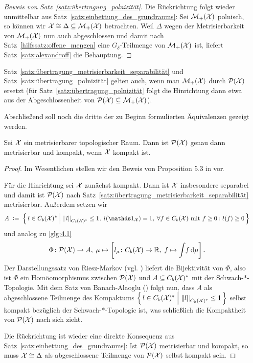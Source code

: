\documentclass[../main/main.tex]{subfiles}
\begin{document}
\begin{proof}[Beweis von Satz~\ref{satz:übertragung_polnizität}]
		Die Rückrichtung folgt wieder unmittelbar aus Satz~\ref{satz:einbettung_des_grundraums}: Sei $\mathcal{M}_{+}(\mathcal{X})$ polnisch, 
		so können wir $\mathcal{X} \cong \Delta \subseteq \mathcal{M}_{+}(\mathcal{X})$ betrachten. Weil $\Delta$ wegen der Metrisierbarkeit von $\mathcal{M}_{+}(\mathcal{X})$ nun auch abgeschlossen und damit nach 
		Satz~\ref{hilfssatz:offene_mengen} eine $G_\delta$-Teilmenge von $\mathcal{M}_{+}(\mathcal{X})$ ist, liefert Satz~\ref{satz:alexandroff} die Behauptung.
	\end{proof}

	\begin{Bemerkung}
		Satz~\ref{satz:übertragung_metrisierbarkeit_separabilität} und Satz~\ref{satz:übertragung_polnizität} gelten auch, wenn man $\mathcal{M}_{+}(\mathcal{X})$ durch $\mathcal{P}(\mathcal{X})$ ersetzt 
		(für Satz~\ref{satz:übertragung_polnizität} folgt die Hinrichtung dann etwa aus der Abgeschlossenheit von $\mathcal{P}(\mathcal{X}) \subseteq \mathcal{M}_{+}(\mathcal{X})$).
	\end{Bemerkung}

	Abschließend soll noch die dritte der zu Beginn formulierten Äquivalenzen gezeigt werden.

	\begin{Satz}
		\label{satz:übertragung_kompaktheit}
		Sei $\mathcal{X}$ ein metrisierbarer topologischer Raum. Dann ist $\mathcal{P}(\mathcal{X})$ genau dann metrisierbar und kompakt, wenn $\mathcal{X}$ kompakt ist.
	\end{Satz}
	
	\begin{proof}
		Im Wesentlichen stellen wir den Beweis von Proposition 5.3 in \cite{vanGaans.200203} vor.
		
		Für die Hinrichtung sei $\mathcal{X}$ zunächst kompakt. Dann ist $\mathcal{X}$ insbesondere separabel und damit ist $\mathcal{P}(\mathcal{X})$ 
		nach Satz~\ref{satz:übertragung_metrisierbarkeit_separabilität} metrisierbar.
		Außerdem setzen wir
		\[ A \; \defby \; \setcomp{l \in \Bdcontfct{\X}^\ast}{\norm{l}_{\Bdcontfct{\X}^\ast} \leq 1, \; l(\indfct_{\X}) = 1, \; 
			\forall f \in \Bdcontfct{\X} \text{ mit } f \geq 0 : l(f) \geq 0}\]
		und analog zu \eqref{glg:4.1}
		\[ \Phi \colon \mathcal{P}(\mathcal{X}) \to A, \; \mu \mapsto \left[l_\mu \colon C_b(\mathcal{X}) \to \mathbb{R}, \; f \mapsto \int_{} \, f \, \mathrm{d}\mu \right]  \text{.} \]
		Der Darstellungssatz von Riesz-Markov (vgl. \cite[Satz 4.8.8]{Simon.2015}) liefert die Bijektivität von $\Phi$, also ist $\Phi$ ein 
		Homöomorphismus zwischen $\mathcal{P}(\mathcal{X})$ und $A \subseteq C_b(\mathcal{X})^\ast$ 
		mit der Schwach-$\ast$-Topologie. Mit dem Satz von Banach-Alaoglu (\cite[Satz 5.8.1]{Simon.2015}) folgt nun, dass $A$ als abgeschlossene Teilmenge des Kompaktums 
		$\left\{\, l \in C_b(\mathcal{X})^\ast \; \middle| \; \left\lVert l\right\rVert_{C_b(\mathcal{X})^\ast} \leq 1 \,\right\}$ selbst kompakt bezüglich der Schwach-$\ast$-Topologie ist, 
		was schließlich die Kompaktheit von $\mathcal{P}(\mathcal{X})$ nach sich zieht.
		
		Die Rückrichtung ist wieder eine direkte Konsequenz aus Satz~\ref{satz:einbettung_des_grundraums}: Ist $\mathcal{P}(\mathcal{X})$ metrisierbar und kompakt, so muss 
		$\mathcal{X} \cong \Delta$ als abgeschlossene Teilmenge von $\mathcal{P}(\mathcal{X})$ selbst kompakt sein.
	\end{proof}
\end{document}
